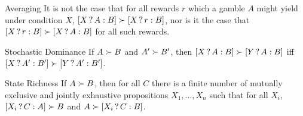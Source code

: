\begin{genericthm}{Averaging} 
  It is not the case that for all rewards $r$ which a gamble $A$ might yield
  under condition $X$, $[X\,?\, A :B] \succ [X\,?\, r :B]$, nor is it the case
  that $[X\,?\, r :B] \succ [X\,?\, A :B]$ for all such rewards.
\end{genericthm}

\vspace{-5mm}
\begin{genericthm}{Stochastic Dominance} 
  If $A \succ B$ and $A'\succ B'$, then $[X\,?\, A :B] \succ [Y\,?\, A :B]$ iff
  $[X\,?\, A' :B'] \succ [Y\,?\, A' :B']$.
\end{genericthm}

\vspace{-5mm}
\begin{genericthm}{State Richness}
  If $A \succ B$, then for all $C$ there is a finite number of mutually
  exclusive and jointly exhaustive propositions $X_1,\ldots,X_n$ such that for
  all $X_i$, $[X_i\,?\, C :A] \succ B$ and $A \succ [X_i\,?\, C :B]$.
\end{genericthm}

  
